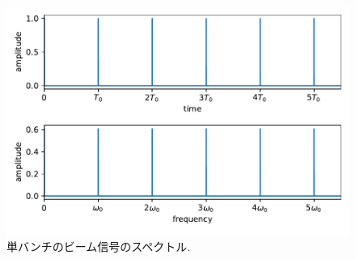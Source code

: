 \documentclass[]{jlreq}
\theoremstyle{definition}
\begin{document}
\begin{figure}[hbt]
  \begin{center}
    \includegraphics[width=12cm,clip]{single_bunch.pdf}
    \caption{単バンチのビーム信号のスペクトル.}
   \label{single_bunch}
  \end{center}
\end{figure}
%
\end{document}
